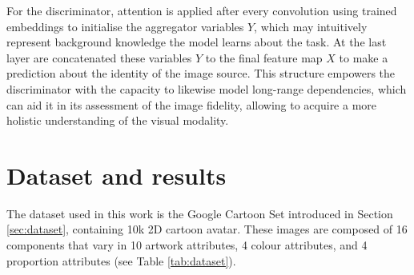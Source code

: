 \documentclass{article}
\begin{document}
	For the discriminator, attention is applied after every convolution using trained embeddings to 
	initialise the aggregator variables $Y$, which may intuitively represent background knowledge the 
	model learns about the task. At the last layer are concatenated these variables $Y$ to the final 
	feature map $X$ to make a prediction about the identity of the image source. 
	This structure empowers the discriminator with the capacity to likewise model long-range 
	dependencies, which can aid it in its assessment of the image fidelity, allowing to acquire a more 
	holistic understanding of the visual modality.
	
	\section{Dataset and results} \label{subsec:app_dataset_result}
	The dataset used in this work is the Google Cartoon Set \cite{cartoonset} introduced in Section 
	\ref{sec:dataset}, containing 10k 2D cartoon avatar. These images are composed of 16 components 
	that vary in 10 artwork attributes, 4 colour attributes, and 4 proportion attributes (see Table 
	\ref{tab:dataset}). 
	
\end{document}
